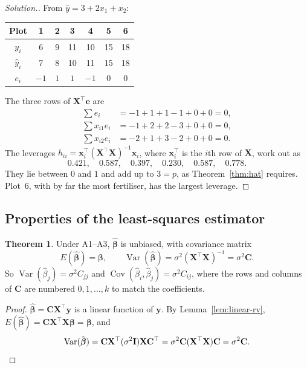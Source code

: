 \documentclass[11pt,a4paper]{article}
\numberwithin{equation}{section}
\theoremstyle{definition}
\newtheorem{thm}{Theorem}[subsection]
\newenvironment{solution}
  {\renewcommand{\qedsymbol}{}\begin{proof}[\textit{Solution}.]}
  {\end{proof}}
\begin{document}
\begin{solution}
From $\hat y = 3 + 2x_1 + x_2$:
\begin{center}
\begin{tabular}{c|cccccc}
Plot & 1 & 2 & 3 & 4 & 5 & 6 \\
\hline
$y_i$ & 6 & 9 & 11 & 10 & 15 & 18 \\
$\hat y_i$ & 7 & 8 & 10 & 11 & 15 & 18 \\
$e_i$ & $-1$ & $1$ & $1$ & $-1$ & $0$ & $0$ \\
\end{tabular}
\end{center}
The three rows of $\mathbf{X}^\top\mathbf{e}$ are
\begin{align*}
\textstyle\sum e_i &= -1 + 1 + 1 - 1 + 0 + 0 = 0, \\
\textstyle\sum x_{i1} e_i &= -1 + 2 + 2 - 3 + 0 + 0 = 0, \\
\textstyle\sum x_{i2} e_i &= -2 + 1 + 3 - 2 + 0 + 0 = 0 .
\end{align*}
The leverages $h_{ii} = \mathbf{x}_i^\top(\mathbf{X}^\top\mathbf{X})^{-1}\mathbf{x}_i$, where
$\mathbf{x}_i^\top$ is the $i$th row of $\mathbf{X}$, work out as
\[
0.421, \quad 0.587, \quad 0.397, \quad 0.230, \quad 0.587, \quad 0.778 .
\]
They lie between $0$ and $1$ and add up to $3 = p$, as Theorem~\ref{thm:hat} requires. Plot~6,
with by far the most fertiliser, has the largest leverage.
\end{solution}

\subsection{Properties of the least-squares estimator}
\begin{thm}\label{thm:beta-props}
Under A1--A3, $\hat{\boldsymbol\beta}$ is unbiased, with covariance matrix
\[
E(\hat{\boldsymbol\beta}) = \boldsymbol\beta, \qquad
\operatorname{Var}(\hat{\boldsymbol\beta}) = \sigma^2(\mathbf{X}^\top\mathbf{X})^{-1} = \sigma^2\mathbf{C} .
\]
So $\operatorname{Var}(\hat\beta_j) = \sigma^2 C_{jj}$ and
$\operatorname{Cov}(\hat\beta_i, \hat\beta_j) = \sigma^2 C_{ij}$, where the rows and columns of
$\mathbf{C}$ are numbered $0, 1, \dots, k$ to match the coefficients.
\end{thm}

\begin{proof}
$\hat{\boldsymbol\beta} = \mathbf{C}\mathbf{X}^\top\mathbf{y}$ is a linear function of
$\mathbf{y}$. By Lemma~\ref{lem:linear-rv},
$E(\hat{\boldsymbol\beta}) = \mathbf{C}\mathbf{X}^\top\mathbf{X}\boldsymbol\beta = \boldsymbol\beta$, and
\[
\operatorname{Var}(\hat{\boldsymbol\beta}) = \mathbf{C}\mathbf{X}^\top(\sigma^2\mathbf{I})\mathbf{X}\mathbf{C}^\top
= \sigma^2\mathbf{C}(\mathbf{X}^\top\mathbf{X})\mathbf{C} = \sigma^2\mathbf{C} . \qedhere
\]
\end{proof}
\end{document}
